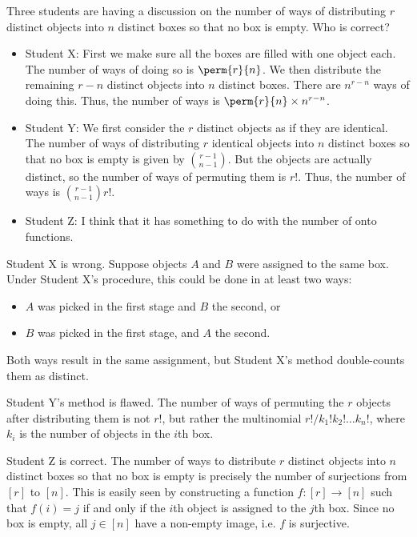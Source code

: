 \begin{problem}
    Three students are having a discussion on the number of ways of distributing $r$ distinct objects into $n$ distinct boxes so that no box is empty. Who is correct?

    \begin{itemize}
        \item Student X: First we make sure all the boxes are filled with one object each. The number of ways of doing so is $\perm{r}{n}$. We then distribute the remaining $r-n$ distinct objects into $n$ distinct boxes. There are $n^{r-n}$ ways of doing this. Thus, the number of ways is $\perm{r}{n} \times n^{r-n}$.
        \item Student Y: We first consider the $r$ distinct objects as if they are identical. The number of ways of distributing $r$ identical objects into $n$ distinct boxes so that no box is empty is given by $\binom{r-1}{n-1}$. But the objects are actually distinct, so the number of ways of permuting them is $r!$. Thus, the number of ways is $\binom{r-1}{n-1} r!$.
        \item Student Z: I think that it has something to do with the number of onto functions.
    \end{itemize}
\end{problem}
\begin{solution}
    Student X is wrong. Suppose objects $A$ and $B$ were assigned to the same box. Under Student X's procedure, this could be done in at least two ways:
    \begin{itemize}
        \item $A$ was picked in the first stage and $B$ the second, or
        \item $B$ was picked in the first stage, and $A$ the second.
    \end{itemize}
    Both ways result in the same assignment, but Student X's method double-counts them as distinct.

    Student Y's method is flawed. The number of ways of permuting the $r$ objects after distributing them is not $r!$, but rather the multinomial $r!/k_1! k_2! \dots k_n!$, where $k_i$ is the number of objects in the $i$th box.

    Student Z is correct. The number of ways to distribute $r$ distinct objects into $n$ distinct boxes so that no box is empty is precisely the number of surjections from $[r]$ to $[n]$. This is easily seen by constructing a function $f : [r] \to [n]$ such that $f(i) = j$ if and only if the $i$th object is assigned to the $j$th box. Since no box is empty, all $j \in [n]$ have a non-empty image, i.e. $f$ is surjective.
\end{solution}

